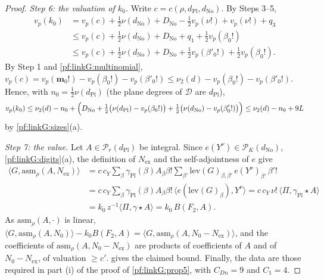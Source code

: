 \begin{proof}
\emph{Step 6: the valuation of $k_0$.} Write $c=c(\rho,d_{\mathrm{Pl}},d_{\mathrm{No}})$. By Steps 3--5,
\begin{align*}
v_p(k_0)&=v_p(c)+\tfrac12\nu(d_{\mathrm{No}})+D_{\mathrm{No}}-\tfrac12v_p(\nu!)+v_p(\nu!)+q_3\\
&\le v_p(c)+\tfrac12\nu(d_{\mathrm{No}})+D_{\mathrm{No}}+q_1+\tfrac12v_p(\beta_0!)\\
&\le v_p(c)+\tfrac12\nu(d_{\mathrm{No}})+D_{\mathrm{No}}+\tfrac12v_p(\beta'_0!)+\tfrac12v_p(\beta_0!) .
\end{align*}
By Step 1 and \cref{pf:linkG:multinomial}, $v_p(c)=v_p(\mathbf m_0!)-v_p(\beta_0!)-v_p(\beta'_0!)\le\nu_2(d)-v_p(\beta_0!)-v_p(\beta'_0!)$. Hence,
with $n_0=\frac12\nu(d_{\mathrm{Pl}})$ (the plane degrees of $\mathcal D$ are $d_{\mathrm{Pl}}$),
\[
v_p(k_0)\le\nu_2(d)-n_0+\Bigl(D_{\mathrm{No}}+\tfrac12\bigl(\nu(d_{\mathrm{Pl}})-v_p(\beta_0!)\bigr)+\tfrac12\bigl(\nu(d_{\mathrm{No}})-v_p(\beta'_0!)\bigr)\Bigr)
\le\nu_2(d)-n_0+9L
\]
by \cref{pf:linkG:sizes}(a).

\emph{Step 7: the value.} Let $A\in\mathcal P_r(d_{\mathrm{Pl}})$ be integral. Since $e(Y^\nu)\in\mathcal P_K(d_{\mathrm{No}})$, \cref{pf:linkG:digits}(a),
the definition of $N_{\mathrm{ex}}$ and the self-adjointness of $e$ give
\begin{align*}
\langle G,\mathrm{asm}_\rho(A,N_{\mathrm{ex}})\rangle&=c\,c_Y\sum_\beta\gamma_{\mathrm{Pl}}(\beta)A_\beta\beta!\sum_{\beta'}\mathrm{lev}(G)_{\beta,\beta'}\,
e(Y^\nu)_{\beta'}\,\beta'!\\
&=c\,c_Y\sum_\beta\gamma_{\mathrm{Pl}}(\beta)A_\beta\beta!\,\bigl\langle e(\mathrm{lev}(G)_\beta),Y^\nu\bigr\rangle
=c\,c_Y\,\nu!\,\langle\Pi,\gamma_{\mathrm{Pl}}\star A\rangle\\
&=k_0\,z^{-1}\langle\Pi,\gamma\star A\rangle=k_0\,B(F_2,A).
\end{align*}
As $\mathrm{asm}_\rho(A,\cdot)$ is linear, $\langle G,\mathrm{asm}_\rho(A,N_0)\rangle-k_0B(F_2,A)=\langle G,\mathrm{asm}_\rho(A,N_0-N_{\mathrm{ex}})\rangle$,
and the coefficients of $\mathrm{asm}_\rho(A,N_0-N_{\mathrm{ex}})$ are products of coefficients of $A$ and of $N_0-N_{\mathrm{ex}}$, of
valuation $\ge c'$.  gives the claimed bound. Finally, the data are those required in part (i) of the
proof of \cref{pf:linkG:prop5}, with $C_{Dn}=9$ and $C_1=4$.
\end{proof}

